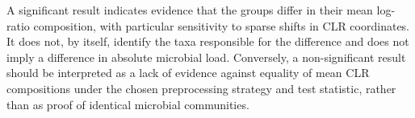 A significant result indicates evidence that the groups differ in their mean log-ratio composition, with particular sensitivity to sparse shifts in CLR coordinates. It does not, by itself, identify the taxa responsible for the difference and does not imply a difference in absolute microbial load. Conversely, a non-significant result should be interpreted as a lack of evidence against equality of mean CLR compositions under the chosen preprocessing strategy and test statistic, rather than as proof of identical microbial communities.
